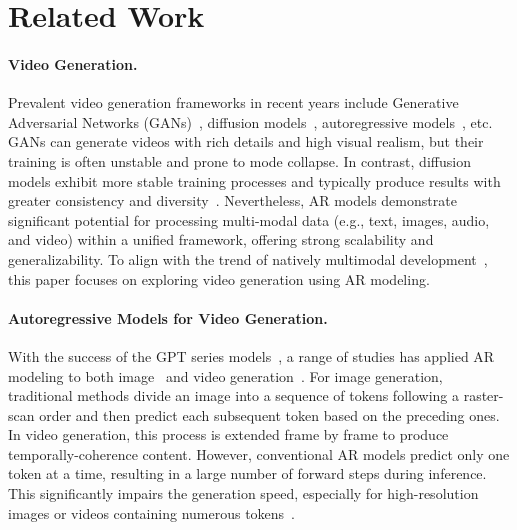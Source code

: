 \section{Related Work}
\paragraph{Video Generation.}
Prevalent video generation frameworks in recent years include Generative Adversarial Networks (GANs)~\citep{Yu2022GeneratingVW, Skorokhodov2021StyleGANVAC}, diffusion models~\citep{Ho2022ImagenVH, Ge2023PreserveYO, Gupta2023PhotorealisticVG, Yang2024CogVideoXTD}, autoregressive models~\citep{hong2022cogvideo, Yan2021VideoGPTVG, Kondratyuk2023VideoPoetAL}, etc. 
GANs can generate videos with rich details and high visual realism, but their training is often unstable and prone to mode collapse. In contrast, diffusion models exhibit more stable training processes and typically produce results with greater consistency and diversity~\citep{Yang2022DiffusionMA}. 
Nevertheless, AR models demonstrate significant potential for processing multi-modal data (e.g., text, images, audio, and video) within a unified framework, offering strong scalability and generalizability. To align with the trend of natively multimodal development~\citep{gpt4o}, this paper focuses on exploring video generation using AR modeling.

\paragraph{Autoregressive Models for Video Generation.}
With the success of the GPT series models~\citep{Brown2020LanguageMA}, a range of studies has applied AR modeling to both image~\citep{Chen2020GenerativePF, Lee2022AutoregressiveIG, wang2024loong, pang2024randar} and video generation~\citep{hong2022cogvideo, Wang2024OmniTokenizerAJ, Yan2021VideoGPTVG}. 
For image generation, traditional methods divide an image into a sequence of tokens following a raster-scan order and then predict each subsequent token based on the preceding ones. In video generation, this process is extended frame by frame to produce temporally-coherence content. 
However, conventional AR models predict only one token at a time, resulting in a large number of forward steps during inference. This significantly impairs the generation speed, especially for high-resolution images or videos containing numerous tokens~\citep{liu2024lumina-mgpt}.

